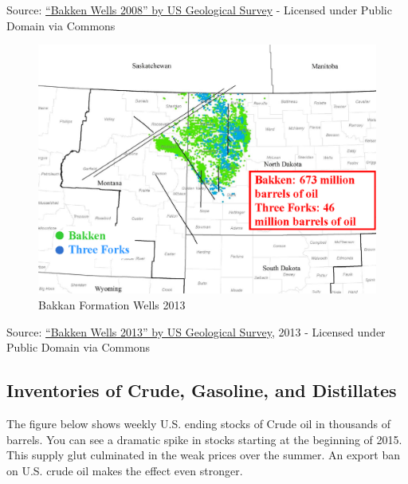 \documentclass[]{book}
\theoremstyle{definition}
\theoremstyle{definition}
\theoremstyle{remark}
\begin{document}
Source:
\href{https://commons.wikimedia.org/wiki/File:Bakken_Wells_2008.png\#/media/File:Bakken_Wells_2008.png}{``Bakken
Wells 2008'' by US Geological Survey} - Licensed under Public Domain via
Commons

\begin{figure}[htbp]
\centering
\includegraphics{images/Bakken_Wells_2013.png}
\caption{Bakkan Formation Wells 2013}
\end{figure}

Source:
\href{https://commons.wikimedia.org/wiki/File:Bakken_Wells_2013.png\#/media/File:Bakken_Wells_2013.png}{``Bakken
Wells 2013'' by US Geological Survey}, 2013 - Licensed under Public
Domain via Commons

\subsection{Inventories of Crude, Gasoline, and
Distillates}\label{inventories-of-crude-gasoline-and-distillates}

The figure below shows weekly U.S. ending stocks of Crude oil in
thousands of barrels. You can see a dramatic spike in stocks starting at
the beginning of 2015. This supply glut culminated in the weak prices
over the summer. An export ban on U.S. crude oil makes the effect even
stronger.
\end{document}

